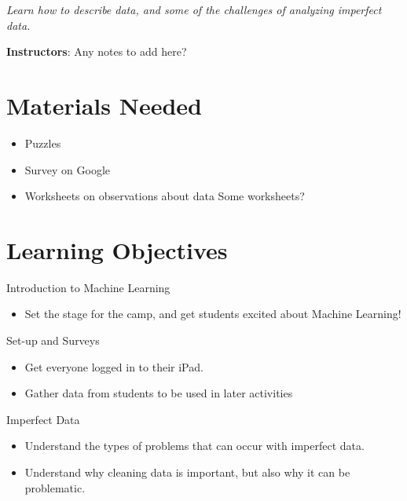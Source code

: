 \documentclass[11pt]{article}
\begin{document}


\Pfrontheader  
\SetBgContents{\PtikzHead} %


\emph{Learn how to describe data, and some of the challenges of analyzing imperfect data.} 

\textbf{Instructors}: {\color{red}Any notes to add here? }

\section*{Materials Needed}

\begin{itemize}
\item Puzzles
\item Survey on Google
\item Worksheets on observations about data {\color{red} Some worksheets?}
\end{itemize}

\section*{Learning Objectives}

Introduction to Machine Learning
\begin{itemize}
\item Set the stage for the camp, and get students excited about Machine Learning!
\end{itemize}

Set-up and Surveys
\begin{itemize}
\item Get everyone logged in to their iPad.
\item Gather data from students to be used in later activities
\end{itemize}

Imperfect Data
\begin{itemize}
\item Understand the types of problems that can occur with imperfect data.
\item Understand why cleaning data is important, but also why it can be problematic.
\end{itemize}
\end{document}
